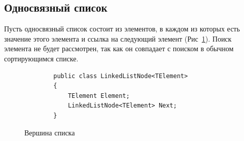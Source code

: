 \documentclass[12pt]{article}
\begin{document}
{			\subsection{Односвязный список}
				\par Пусть односвязный список состоит из элементов, в каждом из которых есть значение этого элемента и ссылка на следующий элемент (Рис~\ref{pic:listNode}). Поиск элемента не будет рассмотрен, так как он совпадает с поиском в обычном сортирующимся списке.
				\begin{figure}[h]
				\begin{lstlisting}
		public class LinkedListNode<TElement>
		{
			TElement Element;
			LinkedListNode<TElement> Next;
		}
				\end{lstlisting}
				\caption{Вершина списка}
				\label{pic:listNode}
				\end{figure}
			\begin{figure}[h!]
				\begin{minipage}[h]{0.45\linewidth}
					\center {}
				\end{minipage}
				\hfill
				\begin{minipage}[h]{0.45\linewidth}
					\center {}
				\end{minipage}
				\vfill
				\begin{minipage}[h]{0.45\linewidth}
					\center {}
\end{minipage}
\end{figure}}
\end{document}
